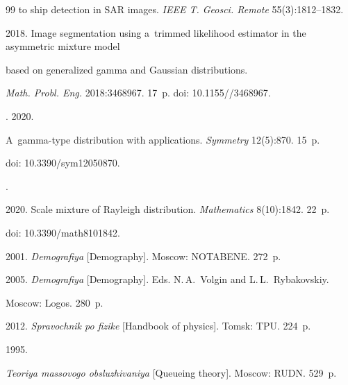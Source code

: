 {{\begin{thebibliography}{99}
 to ship detection in SAR images. \textit{IEEE T. Geosci.  Remote} 55(3):1812--1832.






 2018. Image segmentation using a~trimmed likelihood estimator in the asymmetric mixture model 


 based on generalized gamma and Gaussian distributions. 


 \textit{Math. Probl. Eng.} 2018:3468967. 17~p. doi: 10.1155\!//3468967.




. 2020. 


A~gamma-type distribution with applications. \textit{Symmetry} 12(5):870. 15~p.


doi: 10.3390\!/\!sym12050870.




. 


2020. Scale mixture of Rayleigh distribution. \textit{Mathematics} 8(10):1842. 22~p.


doi: 10.3390\!/\!math8101842.




 2001. \textit{Demografiya} [Demography]. Moscow: NOTABENE. 272~p.






 2005. \textit{Demografiya} [Demography]. Eds. N.\,A.~Volgin and L.\,L.~Rybakovskiy. 


 Moscow: Logos. 280~p.






 2012. \textit{Spravochnik po fizike} [Handbook of physics]. Tomsk: TPU. 224~p.




 1995. 


\textit{Teoriya massovogo obsluzhivaniya} [Queueing theory]. Moscow: RUDN. 529~p.



\end{thebibliography}}}
